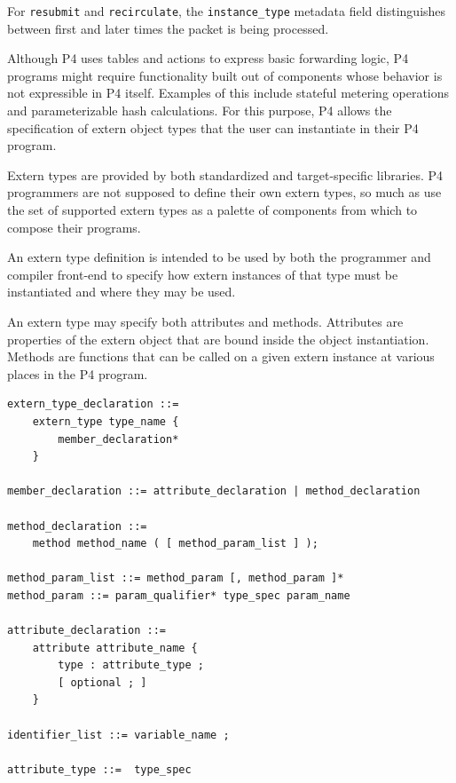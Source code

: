 \documentclass[12pt]{article}
\begin{document}
For \texttt{resubmit} and \texttt{recirculate}, the
\texttt{instance_type} metadata field distinguishes between first and
later times the packet is being processed.



Although P4 uses \matchaction tables and actions to express basic forwarding
logic, P4 programs might require functionality built out of components
whose behavior is not expressible in P4 itself. Examples of this include
stateful metering operations and parameterizable hash calculations. For this
purpose, P4 allows the specification of extern object types that the
user can instantiate in their P4 program.

Extern types are provided by both standardized and target-specific libraries.
P4 programmers are not supposed to define their own extern types, so much
as use the set of supported extern types as a palette of components from which
to compose their programs. 


An extern type definition is intended to be 
used by both the programmer and compiler front-end to specify how extern
instances of that type must be instantiated and where they may be used.

An extern type may specify both attributes and methods. Attributes are
properties of the extern object that are bound inside the object
instantiation. Methods are functions that can be called on a given extern
instance at various places in the P4 program.

\begin{lstlisting}[style=BNFstyle]
extern_type_declaration ::= 
    extern_type type_name {
        member_declaration*
    }

member_declaration ::= attribute_declaration | method_declaration

method_declaration ::= 
    method method_name ( [ method_param_list ] );

method_param_list ::= method_param [, method_param ]*
method_param ::= param_qualifier* type_spec param_name

attribute_declaration ::= 
    attribute attribute_name {
        type : attribute_type ;
        [ optional ; ]
    }

identifier_list ::= variable_name ;

attribute_type ::=  type_spec
\end{lstlisting}
\end{document}
